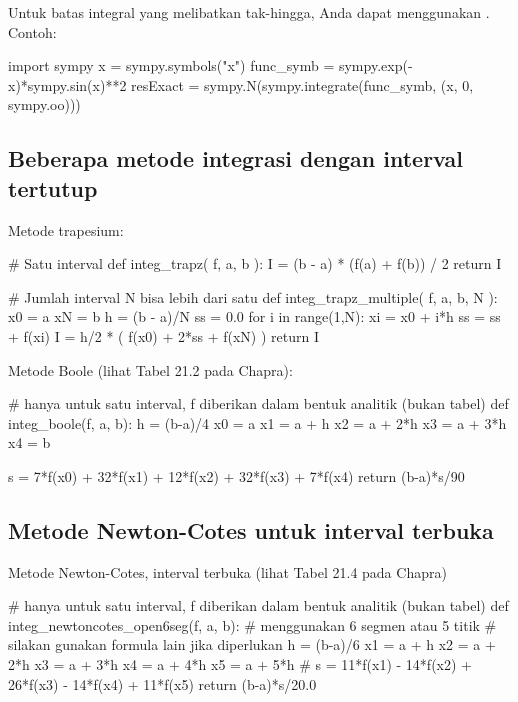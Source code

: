 Untuk batas integral yang melibatkan tak-hingga, Anda dapat menggunakan
. Contoh:
\begin{fullwidth}
\begin{pythoncode}
import sympy
x = sympy.symbols("x")
func_symb = sympy.exp(-x)*sympy.sin(x)**2
resExact = sympy.N(sympy.integrate(func_symb, (x, 0, sympy.oo)))
\end{pythoncode}
\end{fullwidth}


\subsection*{Beberapa metode integrasi dengan interval tertutup}

Metode trapesium:
\begin{pythoncode}
# Satu interval
def integ_trapz( f, a, b ):
    I = (b - a) * (f(a) + f(b)) / 2
    return I

# Jumlah interval N bisa lebih dari satu
def integ_trapz_multiple( f, a, b, N ):
    x0 = a
    xN = b
    h = (b - a)/N
    ss = 0.0
    for i in range(1,N):
        xi = x0 + i*h
        ss = ss + f(xi)
    I = h/2 * ( f(x0) + 2*ss + f(xN) )
    return I
\end{pythoncode}

Metode Boole (lihat Tabel 21.2 pada Chapra):
\begin{fullwidth}
\begin{pythoncode}
# hanya untuk satu interval, f diberikan dalam bentuk analitik (bukan tabel)
def integ_boole(f, a, b):
    h = (b-a)/4
    x0 = a
    x1 = a + h
    x2 = a + 2*h
    x3 = a + 3*h
    x4 = b

    s = 7*f(x0) + 32*f(x1) + 12*f(x2) + 32*f(x3) + 7*f(x4)
    return (b-a)*s/90
\end{pythoncode}
\end{fullwidth}


\subsection*{Metode Newton-Cotes untuk interval terbuka}

Metode Newton-Cotes, interval terbuka (lihat Tabel 21.4 pada Chapra)
\begin{fullwidth}
\begin{pythoncode}
# hanya untuk satu interval, f diberikan dalam bentuk analitik (bukan tabel)
def integ_newtoncotes_open6seg(f, a, b):
    # menggunakan 6 segmen atau 5 titik
    # silakan gunakan formula lain jika diperlukan
    h = (b-a)/6
    x1 = a + h
    x2 = a + 2*h
    x3 = a + 3*h
    x4 = a + 4*h
    x5 = a + 5*h
    #
    s = 11*f(x1) - 14*f(x2) + 26*f(x3) - 14*f(x4) + 11*f(x5)
    return (b-a)*s/20.0
\end{pythoncode}
\end{fullwidth}



